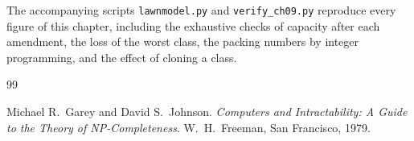 \documentclass[11pt,twoside,openright]{book}
\theoremstyle{plain}
\theoremstyle{definition}
\theoremstyle{remark}
\begin{document}
The accompanying scripts \texttt{lawnmodel.py} and \texttt{verify\_ch09.py} reproduce every figure of this chapter, including the exhaustive checks of capacity after each amendment, the loss of the worst class, the packing numbers by integer programming, and the effect of cloning a class.

\begin{thebibliography}{99}

Michael R.\ Garey and David S.\ Johnson.
\newblock \emph{Computers and Intractability: A Guide to the Theory of NP-Completeness}.
\newblock W.\ H.\ Freeman, San Francisco, 1979.

\end{thebibliography}
\end{document}
